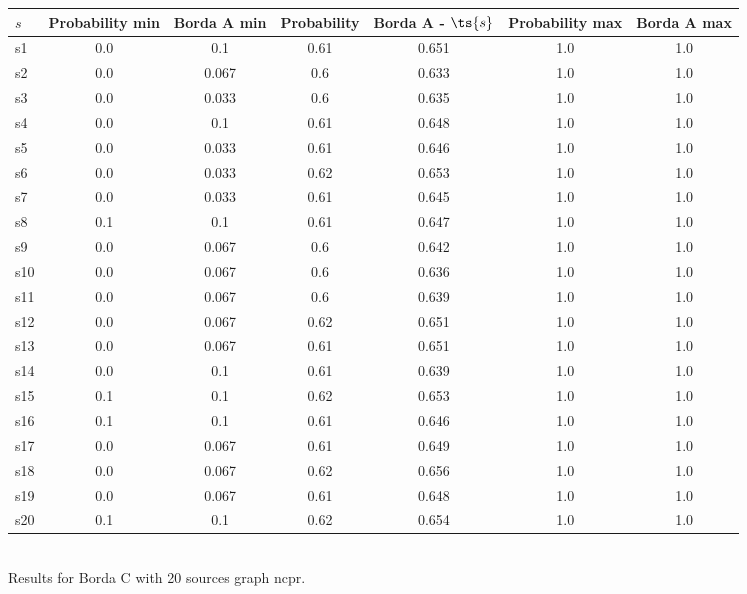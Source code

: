\documentclass{article}
\begin{document}
\noindent\begin{tabular}{|l|c|c|c|c|c|c|}
\hline
$s$& Probability min & Borda A min & Probability & Borda A - $\ts{s}$ & Probability max & Borda A max\\
\hline
s1 &0.0 & 0.1 & 0.61 & 0.651 & 1.0 & 1.0\\
\hline
s2 &0.0 & 0.067 & 0.6 & 0.633 & 1.0 & 1.0\\
\hline
s3 &0.0 & 0.033 & 0.6 & 0.635 & 1.0 & 1.0\\
\hline
s4 &0.0 & 0.1 & 0.61 & 0.648 & 1.0 & 1.0\\
\hline
s5 &0.0 & 0.033 & 0.61 & 0.646 & 1.0 & 1.0\\
\hline
s6 &0.0 & 0.033 & 0.62 & 0.653 & 1.0 & 1.0\\
\hline
s7 &0.0 & 0.033 & 0.61 & 0.645 & 1.0 & 1.0\\
\hline
s8 &0.1 & 0.1 & 0.61 & 0.647 & 1.0 & 1.0\\
\hline
s9 &0.0 & 0.067 & 0.6 & 0.642 & 1.0 & 1.0\\
\hline
s10 &0.0 & 0.067 & 0.6 & 0.636 & 1.0 & 1.0\\
\hline
s11 &0.0 & 0.067 & 0.6 & 0.639 & 1.0 & 1.0\\
\hline
s12 &0.0 & 0.067 & 0.62 & 0.651 & 1.0 & 1.0\\
\hline
s13 &0.0 & 0.067 & 0.61 & 0.651 & 1.0 & 1.0\\
\hline
s14 &0.0 & 0.1 & 0.61 & 0.639 & 1.0 & 1.0\\
\hline
s15 &0.1 & 0.1 & 0.62 & 0.653 & 1.0 & 1.0\\
\hline
s16 &0.1 & 0.1 & 0.61 & 0.646 & 1.0 & 1.0\\
\hline
s17 &0.0 & 0.067 & 0.61 & 0.649 & 1.0 & 1.0\\
\hline
s18 &0.0 & 0.067 & 0.62 & 0.656 & 1.0 & 1.0\\
\hline
s19 &0.0 & 0.067 & 0.61 & 0.648 & 1.0 & 1.0\\
\hline
s20 &0.1 & 0.1 & 0.62 & 0.654 & 1.0 & 1.0\\
\hline
\end{tabular}\\

\noindent Results for Borda C with 20 sources graph ncpr.
\end{document}
